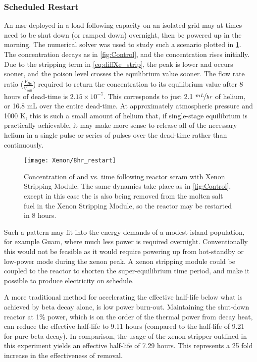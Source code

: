 \subsubsection{Scheduled Restart}
An \acs{msr} deployed in a load-following capacity on an isolated grid may at times need to be shut down (or ramped down) overnight, then be powered up in the morning. The numerical solver was used to study such a scenario plotted in \cref{fig:Restart}. The \I concentration decays as in \cref{fig:Control}, and the \Xe concentration rises initially. Due to the stripping term in \ref{eq:diffXe_strip}, the peak is lower and occurs sooner, and the poison level crosses the equilibrium value sooner. The flow rate ratio ($\frac{\dot{V}_{He}}{\dot{V}_{salt}}$) required to return the \Xe concentration to its equilibrium value after 8 hours of dead-time is $2.15 \times 10^{-7}$. This corresponds to just 2.1 $\nicefrac{mL}{hr}$ of helium, or 16.8 mL over the entire dead-time. At approximately atmospheric pressure and 1000 K, this is such a small amount of helium that, if single-stage equilibrium is practically achievable, it may make more sense to release all of the necessary helium in a single pulse or series of pulses over the dead-time rather than continuously.

\begin{figure}[b!]
    \centering
    \texttt{[image: Xenon/8hr\_restart]}
    \caption[Concentration of \I and \Xe vs. time following reactor scram - Restart Mode]{Concentration of \I and \Xe vs. time following reactor scram with Xenon Stripping Module. The same dynamics take place as in \cref{fig:Control}, except in this case the \Xe is also being removed from the molten salt fuel in the Xenon Stripping Module, so the reactor may be restarted in 8 hours.}
    \label{fig:Restart}
\end{figure}

Such a pattern may fit into the energy demands of a modest island population, for example Guam, where much less power is required overnight. Conventionally this would not be feasible as it would require powering up from hot-standby or low-power mode during the xenon peak. A xenon stripping module could be coupled to the reactor to shorten the super-equilibrium time period, and make it possible to produce electricity on schedule.

A more traditional method for accelerating the effective half-life below what is achieved by beta decay alone, is low power burn-out. Maintaining the shut-down reactor at 1\% power, which is on the order of the thermal power from decay heat, can reduce the effective half-life to 9.11 hours (compared to the half-life of 9.21 for pure beta decay). In comparison, the usage of the xenon stripper outlined in this experiment yields an effective half-life of 7.29 hours. This represents a 25 fold increase in the effectiveness of \Xe removal.

